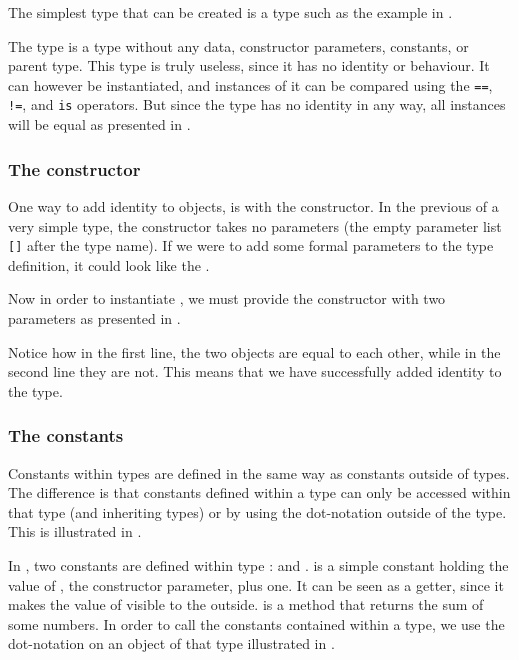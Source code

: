 The simplest type that can be created is a type such as the example in
.


The type  is a type without any data, constructor parameters, constants,
or parent type. This type is truly useless, since it has no identity or
behaviour. It can however be instantiated, and instances of it can be compared
using the \texttt{==}, \texttt{!=}, and \texttt{is} operators. But since the
type has no identity in any way, all instances will be equal as presented in
.


\subsubsection{The constructor}

One way to add identity to objects, is with the constructor. In the previous
 of a very simple type, the constructor takes no parameters (the empty
parameter list \texttt{[]} after the type name). If we were to add some formal
parameters to the type definition, it could look like the
.


Now in order to instantiate , we must provide the constructor with two
parameters as presented in . 


Notice how in the first line, the two objects are equal to each other, while in
the second line they are not. This means that we have successfully added
identity to the  type.

\subsubsection{The constants}

Constants within types are defined in the same way as constants outside of
types. The difference is that constants defined within a type can only be
accessed within that type (and inheriting types) or by using the dot-notation
outside of the type. This is illustrated in .


In , two constants are defined within type :
 and .  is a simple
constant holding the value of , the constructor parameter, plus one.
It can be seen as a getter, since it makes the value of  visible to
the outside.  is a method that returns the sum of some
numbers. In order to call the constants contained within a type, we use the dot-notation 
on an object of that type illustrated in .

